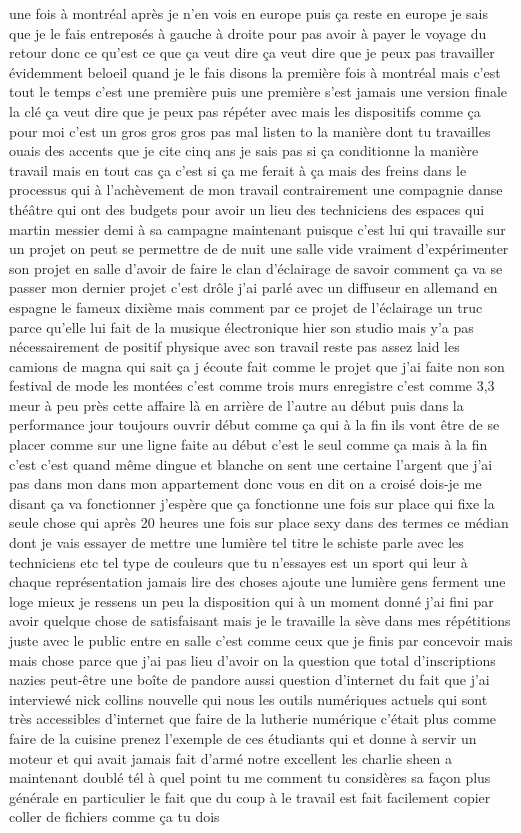 une fois à montréal après je n'en vois en europe puis ça reste en europe je sais que je le fais entreposés à gauche à droite pour pas avoir à payer le voyage du retour donc ce qu'est ce que ça veut dire ça veut dire que je peux pas travailler évidemment beloeil quand je le fais disons la première fois à montréal mais c'est tout le temps c'est une première puis une première s'est jamais une version finale la clé ça veut dire que je peux pas répéter avec mais les dispositifs comme ça pour moi c'est un gros gros gros pas mal listen to la manière dont tu travailles ouais des accents que je cite cinq ans je sais pas si ça conditionne la manière travail mais en tout cas ça c'est si ça me ferait à ça mais des freins dans le processus qui à l'achèvement de mon travail contrairement une compagnie danse théâtre qui ont des budgets pour avoir un lieu des techniciens des espaces qui martin messier demi à sa campagne maintenant puisque c'est lui qui travaille sur un projet on peut se permettre de de nuit une salle vide vraiment d'expérimenter son projet en salle d'avoir de faire le clan d'éclairage de savoir comment ça va se passer mon dernier projet c'est drôle j'ai parlé avec un diffuseur en allemand en espagne le fameux dixième mais comment par ce projet de l'éclairage un truc parce qu'elle lui fait de la musique électronique hier son studio mais y'a pas nécessairement de positif physique avec son travail reste pas assez laid les camions de magna qui sait ça j écoute fait comme le projet que j'ai faite non son festival de mode les montées c'est comme trois murs enregistre c'est comme 3,3 meur à peu près cette affaire là en arrière de l'autre au début puis dans la performance jour toujours ouvrir début comme ça qui à la fin ils vont être de se placer comme sur une ligne faite au début c'est le seul comme ça mais à la fin c'est c'est quand même dingue et blanche on sent une certaine l'argent que j'ai pas dans mon dans mon appartement donc vous en dit on a croisé dois-je me disant ça va fonctionner j'espère que ça fonctionne une fois sur place qui fixe la seule chose qui après 20 heures une fois sur place sexy dans des termes ce médian dont je vais essayer de mettre une lumière tel titre le schiste parle avec les techniciens etc tel type de couleurs que tu n'essayes est un sport qui leur à chaque représentation jamais lire des choses ajoute une lumière gens ferment une loge mieux je ressens un peu la disposition qui à un moment donné j'ai fini par avoir quelque chose de satisfaisant mais je le travaille la sève dans mes répétitions juste avec le public entre en salle c'est comme ceux que je finis par concevoir mais mais chose parce que j'ai pas lieu d'avoir on la question que total d'inscriptions nazies peut-être une boîte de pandore aussi question d'internet du fait que j'ai interviewé nick collins nouvelle qui nous les outils numériques actuels qui sont très accessibles d'internet que faire de la lutherie numérique c'était plus comme faire de la cuisine prenez l'exemple de ces étudiants qui et donne à servir un moteur et qui avait jamais fait d'armé notre excellent les charlie sheen a maintenant doublé tél à quel point tu me comment tu considères sa façon plus générale en particulier le fait que du coup à le travail est fait facilement copier coller de fichiers comme ça tu dois 